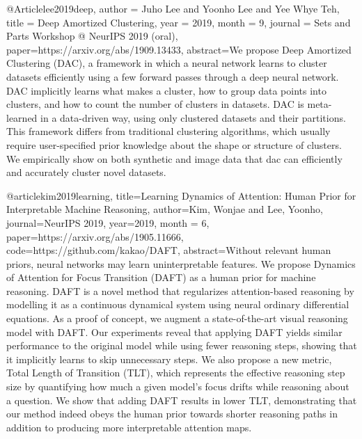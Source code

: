 @Article{lee2019deep,
  author        = {Juho Lee and Yoonho Lee and Yee Whye Teh},
  title         = {Deep Amortized Clustering},
  year          = {2019},
  month = {9},
  journal = {Sets and Parts Workshop @ NeurIPS 2019 (oral)},
  paper={https://arxiv.org/abs/1909.13433},
  abstract={We propose Deep Amortized Clustering (DAC), a framework in which a neural network learns to cluster datasets efficiently using a few forward passes through a deep neural network. DAC implicitly learns what makes a cluster, how to group data points into clusters, and how to count the number of clusters in datasets. DAC is meta-learned in a data-driven way, using only clustered datasets and their partitions. This framework differs from traditional clustering algorithms, which usually require user-specified prior knowledge about the shape or structure of clusters. We empirically show on both synthetic and image data that \gls{dac} can efficiently and accurately cluster novel datasets.}
}

@article{kim2019learning,
  title={Learning Dynamics of Attention: Human Prior for Interpretable Machine Reasoning},
  author={Kim, Wonjae and Lee, Yoonho},
  journal={NeurIPS 2019},
  year={2019},
  month = {6},
  paper={https://arxiv.org/abs/1905.11666},
  code={https://github.com/kakao/DAFT},
  abstract={Without relevant human priors, neural networks may learn uninterpretable features. We propose Dynamics of Attention for Focus Transition (DAFT) as a human prior for machine reasoning. DAFT is a novel method that regularizes attention-based reasoning by modelling it as a continuous dynamical system using neural ordinary differential equations. As a proof of concept, we augment a state-of-the-art visual reasoning model with DAFT. Our experiments reveal that applying DAFT yields similar performance to the original model while using fewer reasoning steps, showing that it implicitly learns to skip unnecessary steps. We also propose a new metric, Total Length of Transition (TLT), which represents the effective reasoning step size by quantifying how much a given model's focus drifts while reasoning about a question. We show that adding DAFT results in lower TLT, demonstrating that our method indeed obeys the human prior towards shorter reasoning paths in addition to producing more interpretable attention maps.}
}

